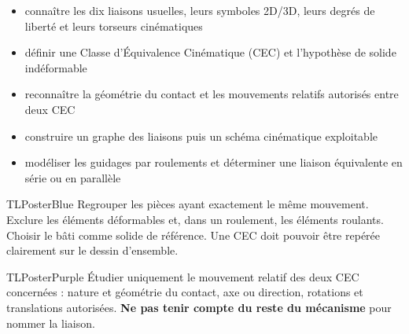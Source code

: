 \documentclass[10pt,a3paper]{article}
\begin{document}
\vspace{2mm}
\begin{minipage}[t]{0.61\linewidth}
\begin{TLPosterSavoirs}
\begin{itemize}
  \item connaître les dix liaisons usuelles, leurs symboles 2D/3D, leurs degrés de liberté et leurs torseurs cinématiques
  \item définir une Classe d'Équivalence Cinématique (CEC) et l'hypothèse de solide indéformable
  \item reconnaître la géométrie du contact et les mouvements relatifs autorisés entre deux CEC
  \item construire un graphe des liaisons puis un schéma cinématique exploitable
  \item modéliser les guidages par roulements et déterminer une liaison équivalente en série ou en parallèle
\end{itemize}
\end{TLPosterSavoirs}
\end{minipage}\hfill
\begin{minipage}[t]{0.36\linewidth}
\end{minipage}
\vfill
\begin{minipage}[t]{0.49\linewidth}
\begin{TLPosterBloc}{TLPosterBlue}
Regrouper les pièces ayant exactement le même mouvement. Exclure les éléments déformables et, dans un roulement, les éléments roulants. Choisir le bâti comme solide de référence. Une CEC doit pouvoir être repérée clairement sur le dessin d'ensemble.
\end{TLPosterBloc}
\begin{TLPosterBloc}{TLPosterPurple}
Étudier uniquement le mouvement relatif des deux CEC concernées : nature et géométrie du contact, axe ou direction, rotations et translations autorisées. \textbf{Ne pas tenir compte du reste du mécanisme} pour nommer la liaison.
\end{TLPosterBloc}
\end{minipage}\hfill
\end{document}
